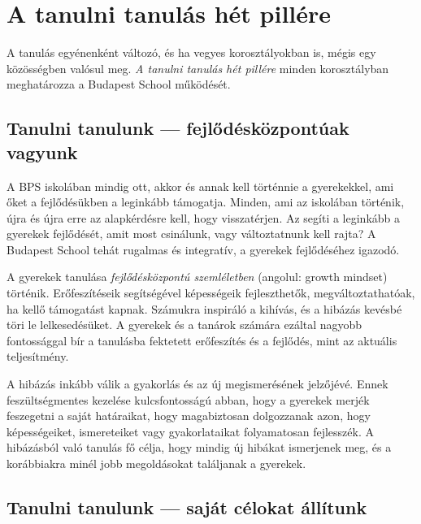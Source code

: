 \hypertarget{a-tanulni-tanulas-het-pillere}{%
\section{A tanulni tanulás hét
pillére}\label{a-tanulni-tanulas-het-pillere}}

A tanulás egyénenként változó, és ha vegyes korosztályokban is, mégis\break
egy közösségben valósul meg. \emph{A tanulni tanulás hét pillére\/} minden
korosztályban meghatározza a Budapest School működését.

\hypertarget{tanulni-tanulunk-fejlodeskozpontuak-vagyunk}{%
\subsection{Tanulni tanulunk --- fejlődésközpontúak
vagyunk}\label{tanulni-tanulunk-fejlodeskozpontuak-vagyunk}}

A BPS iskolában mindig ott, akkor és annak kell történnie a gyerekekkel,
ami őket a fejlődésükben a leginkább támogatja. Minden, ami az iskolában
történik, újra és újra erre az alapkérdésre kell, hogy visszatérjen. Az
segíti a leginkább a gyerekek fejlődését, amit most csinálunk, vagy
változtatnunk kell rajta? A Budapest School tehát rugalmas és
integratív, a gyerekek fejlődéséhez igazodó.

A gyerekek tanulása
\emph{fejlődésközpontú
szemléletben} {\autocite{szabo:17}} (angolul: growth mindset) történik. Erőfeszítéseik
segítségével képességeik fejleszthetők, megváltoztathatóak, ha kellő
támogatást kapnak. Számukra inspiráló a kihívás, és a hibázás kevésbé
töri le lelkesedésüket. A gyerekek és a tanárok számára ezáltal nagyobb
fontossággal bír a tanulásba fektetett erőfeszítés és a fejlődés, mint
az aktuális teljesítmény.

A hibázás inkább válik a gyakorlás és az új megismerésének jelzőjévé.
Ennek feszültségmentes kezelése kulcsfontosságú abban, hogy a gyerekek
merjék feszegetni a saját határaikat, hogy magabiztosan dolgozzanak
azon, hogy képességeiket, ismereteiket vagy gyakorlataikat folyamatosan
fejlesszék. A hibázásból való tanulás fő célja, hogy mindig új hibákat
ismerjenek meg, és a korábbiakra minél jobb megoldásokat találjanak a
gyerekek.

\hypertarget{tanulni-tanulunk-sajat-celokat-allitunk}{%
\subsection{Tanulni tanulunk --- saját célokat
állítunk}\label{tanulni-tanulunk-sajat-celokat-allitunk}}

